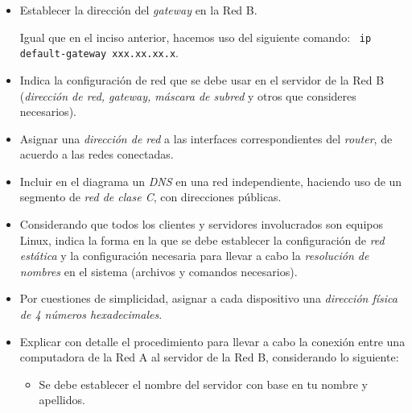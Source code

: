 \documentclass[spanish,12pt,letterpaper]{article}
\begin{document}
\begin{itemize}
\item Establecer la dirección del \textit{gateway} en la Red B.

  Igual que en el inciso anterior, hacemos uso del siguiente comando: \texttt{
  ip default-gateway xxx.xx.xx.x}.
  
\item Indica la configuración de red que se debe usar en el servidor de la Red B
  (\textit{dirección de red, gateway, máscara de subred} y otros que consideres
  necesarios).
  
\item Asignar una \textit{dirección de red} a las interfaces correspondientes del
  \textit{router}, de acuerdo a las redes conectadas.
  
\item Incluir en el diagrama un \textit{DNS} en una red independiente, haciendo
  uso de un segmento de \textit{red de clase C}, con direcciones públicas.
  
\item Considerando que todos los clientes y servidores involucrados son equipos
  Linux, indica la forma en la que se debe establecer la configuración de
  \textit{red estática} y la configuración necesaria para llevar a cabo la
  \textit{resolución de nombres} en el sistema (archivos y comandos necesarios).
  
\item Por cuestiones de simplicidad, asignar a cada dispositivo  una
  \textit{dirección física de 4 números hexadecimales}.
  
\item Explicar con detalle el procedimiento para llevar a cabo la conexión entre
  una computadora de la Red A al servidor de la Red B, considerando lo siguiente:
  \begin{itemize}
  \item Se debe establecer el nombre del servidor con base en tu nombre y
    apellidos.
    

\end{itemize}
\end{itemize}
\end{document}
